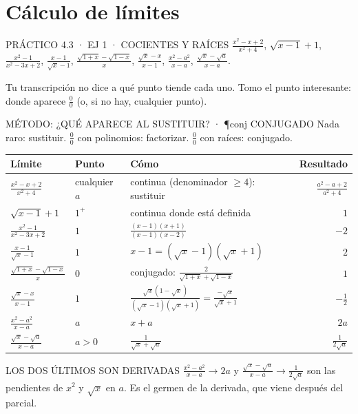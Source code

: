 \section{Cálculo de límites}

\begin{enunciado}{PRÁCTICO 4.3 · EJ 1 · COCIENTES Y RAÍCES}
$\frac{x^2-x+2}{x^2+4}$, $\sqrt{x-1}+1$, $\frac{x^2-1}{x^2-3x+2}$, $\frac{x-1}{\sqrt x-1}$, $\frac{\sqrt{1+x}-\sqrt{1-x}}x$, $\frac{\sqrt x-x}{x-1}$, $\frac{x^2-a^2}{x-a}$, $\frac{\sqrt x-\sqrt a}{x-a}$.
\end{enunciado}
\begin{falta}
Tu transcripción no dice a qué punto tiende cada uno. Tomo el punto interesante: donde aparece $\frac00$ (o, si no hay, cualquier punto).
\end{falta}
\begin{uso}{MÉTODO: ¿QUÉ APARECE AL SUSTITUIR? · \P{conj} CONJUGADO}
Nada raro: sustituir. $\frac00$ con polinomios: factorizar. $\frac00$ con raíces: conjugado.
\end{uso}
\begin{center}\small
\begin{tabularx}{\linewidth}{@{}l l X r@{}}\toprule
Límite & Punto & Cómo & Resultado\\\midrule
$\frac{x^2-x+2}{x^2+4}$ & cualquier $a$ & continua (denominador $\ge4$): sustituir & $\frac{a^2-a+2}{a^2+4}$\\
$\sqrt{x-1}+1$ & $1^+$ & continua donde está definida & $1$\\
$\frac{x^2-1}{x^2-3x+2}$ & $1$ & $\frac{(x-1)(x+1)}{(x-1)(x-2)}$ & $-2$\\
$\frac{x-1}{\sqrt x-1}$ & $1$ & $x-1=(\sqrt x-1)(\sqrt x+1)$ & $2$\\
$\frac{\sqrt{1+x}-\sqrt{1-x}}x$ & $0$ & conjugado: $\frac2{\sqrt{1+x}+\sqrt{1-x}}$ & $1$\\
$\frac{\sqrt x-x}{x-1}$ & $1$ & $\frac{\sqrt x(1-\sqrt x)}{(\sqrt x-1)(\sqrt x+1)}=\frac{-\sqrt x}{\sqrt x+1}$ & $-\frac12$\\
$\frac{x^2-a^2}{x-a}$ & $a$ & $x+a$ & $2a$\\
$\frac{\sqrt x-\sqrt a}{x-a}$ & $a>0$ & $\frac1{\sqrt x+\sqrt a}$ & $\frac1{2\sqrt a}$\\\bottomrule
\end{tabularx}
\end{center}
\begin{tip}{LOS DOS ÚLTIMOS SON DERIVADAS}
$\frac{x^2-a^2}{x-a}\to2a$ y $\frac{\sqrt x-\sqrt a}{x-a}\to\frac1{2\sqrt a}$ son las pendientes de $x^2$ y $\sqrt x$ en $a$. Es el germen de la derivada, que viene después del parcial.
\end{tip}

